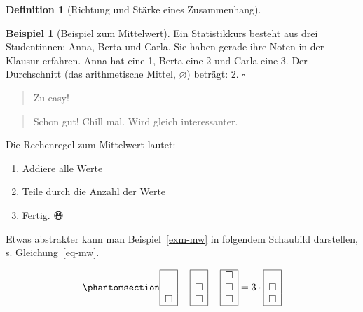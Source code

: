 \documentclass[
  a4paper,
  DIV=11]{scrreprt}
\providecommand{\tightlist}{%
  \setlength{\itemsep}{0pt}\setlength{\parskip}{0pt}}\usepackage{longtable,booktabs,array}
\theoremstyle{definition}
\theoremstyle{definition}
\newtheorem{example}{Beispiel}[chapter]
\theoremstyle{definition}
\newtheorem{definition}{Definition}[chapter]
\theoremstyle{remark}
\begin{document}
\begin{definition}[Richtung und Stärke eines
Zusammenhang]
\begin{example}[Beispiel zum
Mittelwert]
Ein Statistikkurs besteht aus drei Studentinnen: Anna, Berta und Carla.
Sie haben gerade ihre Noten in der Klausur erfahren. Anna hat eine 1,
Berta eine 2 und Carla eine 3. Der Durchschnitt (das arithmetische
Mittel, \(\varnothing\)) beträgt: 2. \(\square\)

\end{example}

\begin{quote}
{} Zu easy!
\end{quote}

\begin{quote}
{} Schon gut! Chill mal. Wird gleich interessanter.
\end{quote}

Die Rechenregel zum Mittelwert lautet:

\begin{enumerate}
\def\labelenumi{\arabic{enumi}.}
\tightlist
\item
  Addiere alle Werte
\item
  Teile durch die Anzahl der Werte
\item
  Fertig. 😄
\end{enumerate}

Etwas abstrakter kann man Beispiel~\ref{exm-mw} in folgendem Schaubild
darstellen, s. Gleichung~\ref{eq-mw}.

\begin{equation}\phantomsection\label{eq-mw}{
\begin{array}{|c|} \hline \\ \\ \square \\ \hline \end{array} + \begin{array}{|c|} \hline \\ \square \\ \square \\ \hline \end{array} + \begin{array}{|c|} \hline \square \\ \square \\ \square \\ \hline \end{array} = 3 \cdot \begin{array}{|c|} \hline \\ \square \\ \square \\ \hline \end{array}
}\end{equation}


\end{definition}
\end{document}
